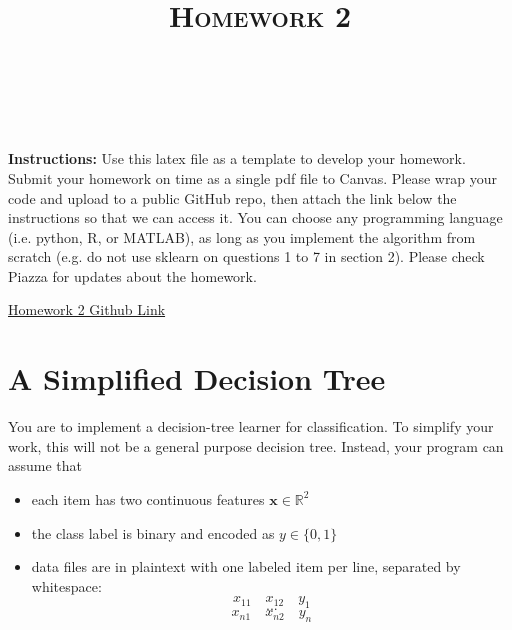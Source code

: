 \documentclass[a4paper]{article}
\title{\textsc{Homework 2}} %
\author{
\red{APOORVA KUMAR} \\
\red{908 461 5997}\\
}
\date{}
\theoremstyle{definition}
\newcommand{\RR}{\mathbb{R}}
\def\x{\mathbf x}
\newenvironment{soln}{
    \leavevmode\color{blue}\ignorespaces
}{}
\begin{document}
\maketitle 


\textbf{Instructions:} 
Use this latex file as a template to develop your homework. Submit your homework on time as a single pdf file to Canvas. Please wrap your code and upload to a public GitHub repo, then attach the link below the instructions so that we can access it. You can choose any programming language (i.e. python, R, or MATLAB), as long as you implement the algorithm from scratch (e.g. do not use sklearn on questions 1 to 7 in section 2). Please check Piazza for updates about the homework.\\

\begin{soln}
  \Large
  \href{https://github.com/cybr17crwlr/ECE-760-Machine-Learning-Assignments/tree/master/Homework%202}{Homework 2 Github Link}
\end{soln}

\section{A Simplified Decision Tree}
You are to implement a decision-tree learner for classification.
To simplify your work, this will not be a general purpose decision tree.  Instead, your program can assume that
\begin{itemize}
\item each item has two continuous features $\x \in \RR^2$
\item the class label is binary and encoded as $y \in \{0,1\}$
\item data files are in plaintext with one labeled item per line, separated by whitespace:
$$x_{11} \quad x_{12} \quad y_1$$
$$...$$
$$x_{n1} \quad x_{n2} \quad y_n$$
\end{itemize}
\end{document}
